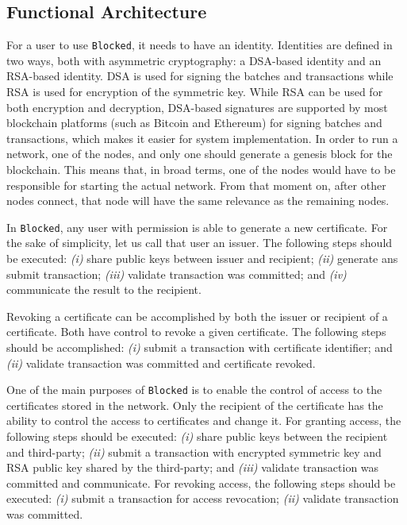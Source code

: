 \subsection{Functional Architecture}
\label{sec:design-interaction}

For a user to use \texttt{Blocked}, it needs to have an identity. Identities are defined in two ways, both with asymmetric cryptography: a DSA-based identity and an RSA-based identity. DSA \cite{cameron_f._kerry_digital_2013} is used for signing the batches and transactions while RSA \cite{rivest_method_1978} is used for encryption of the symmetric key. While RSA \cite{rivest_method_1978} can be used for both encryption and decryption, DSA-based signatures are supported by most blockchain platforms (such as Bitcoin and Ethereum) for signing batches and transactions, which makes it easier for system implementation. In order to run a network, one of the nodes, and only one should generate a genesis block for the blockchain. This means that, in broad terms, one of the nodes would have to be responsible for starting the actual network. From that moment on, after other nodes connect, that node will have the same relevance as the remaining nodes.

In \texttt{Blocked}, any user with permission is able to generate a new certificate. For the sake of simplicity, let us call that user an issuer. The following steps should be executed: \emph{(i)} share public keys between issuer and recipient; \emph{(ii)} generate ans submit transaction; \emph{(iii)} validate transaction was committed; and \emph{(iv)} communicate the result to the recipient.

Revoking a certificate can be accomplished by both the issuer or recipient of a certificate. Both have control to revoke a given certificate. The following steps should be accomplished: \emph{(i)} submit a transaction with certificate identifier; and \emph{(ii)} validate transaction was committed and certificate revoked.

One of the main purposes of \texttt{Blocked} is to enable the control of access to the certificates stored in the network. Only the recipient of the certificate has the ability to control the access to certificates and change it. For granting access, the following steps should be executed: \emph{(i)} share public keys between the recipient and third-party; \emph{(ii)} submit a transaction with encrypted symmetric key and RSA public key shared by the third-party; and \emph{(iii)} validate transaction was committed and communicate. For revoking access, the following steps should be executed: \emph{(i)} submit a transaction for access revocation; \emph{(ii)} validate transaction was committed.

